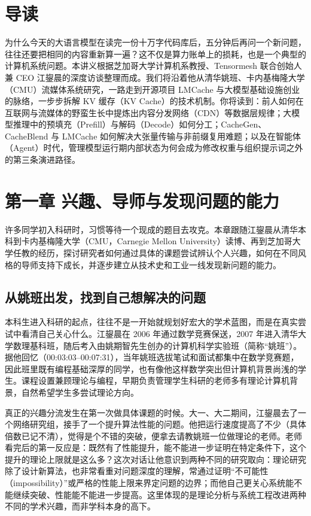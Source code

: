 \documentclass[UTF8,a4paper,11pt,fontset=fandol]{ctexart}
\begin{document}
\section*{导读}
为什么今天的大语言模型在读完一份十万字代码库后，五分钟后再问一个新问题，往往还要把相同的内容重新算一遍？这不仅是算力账单上的损耗，也是一个典型的计算机系统问题。本讲义根据芝加哥大学计算机系教授、Tensormesh 联合创始人兼 CEO 江鋆晨的深度访谈整理而成。我们将沿着他从清华姚班、卡内基梅隆大学（CMU）流媒体系统研究，一路走到开源项目 LMCache 与大模型基础设施创业的脉络，一步步拆解 KV 缓存（KV Cache）的技术机制。你将读到：前人如何在互联网与流媒体的野蛮生长中提炼出内容分发网络（CDN）等数据层规律；大模型推理中的预填充（Prefill）与解码（Decode）如何分工；CacheGen、CacheBlend 与 LMCache 如何解决大张量传输与非前缀复用难题；以及在智能体（Agent）时代，管理模型运行期内部状态为何会成为修改权重与组织提示词之外的第三条演进路径。
\section{第一章 兴趣、导师与发现问题的能力}
许多同学初入科研时，习惯等待一个现成的题目去攻克。本章跟随江鋆晨从清华本科到卡内基梅隆大学（CMU，Carnegie Mellon University）读博、再到芝加哥大学任教的经历，探讨研究者如何通过具体的课题尝试辨认个人兴趣，如何在不同风格的导师支持下成长，并逐步建立从技术史和工业一线发现新问题的能力。
\subsection{从姚班出发，找到自己想解决的问题}
本科生进入科研的起点，往往不是一开始就规划好宏大的学术蓝图，而是在真实尝试中看清自己关心什么。江鋆晨在 2006 年通过数学竞赛保送，2007 年进入清华大学数理基科班，随后考入由姚期智先生创办的计算机科学实验班（简称“姚班”）。据他回忆（00:03:03–00:07:31），当年姚班选拔笔试和面试都集中在数学竞赛题，因此班里既有编程基础深厚的同学，也有像他这样数学突出但计算机背景尚浅的学生。课程设置兼顾理论与编程，早期负责管理学生科研的老师多有理论计算机背景，自然希望学生多尝试理论方向。

真正的兴趣分流发生在第一次做具体课题的时候。大一、大二期间，江鋆晨去了一个网络研究组，接手了一个提升算法性能的问题。他把运行速度提高了不少（具体倍数已记不清），觉得是个不错的突破，便拿去请教姚班一位做理论的老师。老师看完后的第一反应是：既然有了性能提升，能不能进一步证明在特定条件下，这个提升的理论上限就是这么多？这次对话让他意识到两种不同的研究取向：理论研究除了设计新算法，也非常看重对问题深度的理解，常通过证明“不可能性（impossibility）”或严格的性能上限来界定问题的边界；而他自己更关心系统能不能继续突破、性能能不能进一步提高。这里体现的是理论分析与系统工程改进两种不同的学术兴趣，而非学科本身的高下。
\end{document}
